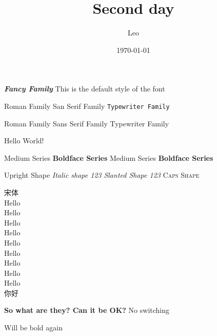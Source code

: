 \documentclass{article}
\title{Second day}
\author{Leo}
\date{\today}
\newcommand{\myfont}{\textit{\textbf{\textsf{Fancy Family}}}}
\begin{document}
\maketitle

\myfont{
    This is the default style of the font
}


\textrm{Roman Family} \textsf{San Serif Family} \texttt{Typewriter Family}


{\rmfamily Roman Family} {\sffamily Sans Serif Family} {\ttfamily Typewriter Family}

\sffamily Hello World!

\textmd{Medium Series} \textbf{Boldface Series}
{\mdseries Medium Series} {\bfseries Boldface Series}

\textup{Upright Shape} \textit{Italic shape 123}
{\slshape Slanted Shape 123} {\scshape Caps Shape}

{\songti 宋体}\\
{\tiny Hello} \\
{\scriptsize Hello} \\
{\footnotesize Hello} \\
{\small Hello} \\
{\normalsize Hello} \\
{\large Hello} \\
{\LARGE Hello} \\
{\huge Hello} \\
{\Huge Hello} \\
{你好}


{\bfseries
So what are they?
Can it be OK?
}
No switching

Will be bold again
\end{document}
